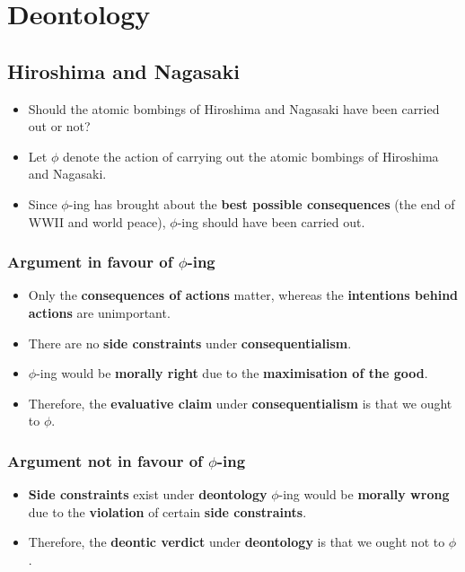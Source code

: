 \documentclass[11pt]{article}
\begin{document}
 \newpage
\section{Deontology}
\label{sec:orga25cbaf}

\subsection{Hiroshima and Nagasaki}
\label{sec:orgf75df34}
\begin{itemize}
\item Should the atomic bombings of Hiroshima and Nagasaki have been carried out or not?
\item Let \(\phi\) denote the action of carrying out the atomic bombings of Hiroshima and Nagasaki.
\item Since \(\phi\)-ing has brought about the \textbf{best possible consequences} (the end of WWII and world peace), \(\phi\)-ing should have been carried out.
\end{itemize}
\subsubsection{Argument in favour of \(\phi\)-ing}
\label{sec:org4d3b11d}
\begin{itemize}
\item Only the \textbf{consequences of actions} matter, whereas the \textbf{intentions behind actions} are unimportant.
\item There are no \textbf{side constraints} under \textbf{consequentialism}.
\item \(\phi\)-ing would be \textbf{morally right} due to the \textbf{maximisation of the good}.
\item Therefore, the \textbf{evaluative claim} under \textbf{consequentialism} is that we ought to \(\phi\).
\end{itemize}
\subsubsection{Argument not in favour of \(\phi\)-ing}
\label{sec:orge0e4dd7}
\begin{itemize}
\item \textbf{Side constraints} exist under \textbf{deontology} \(\phi\)-ing would be \textbf{morally wrong} due to the \textbf{violation} of certain \textbf{side constraints}.
\item Therefore, the \textbf{deontic verdict} under \textbf{deontology} is that we ought not to \(\phi\).
\end{itemize}
\end{document}
